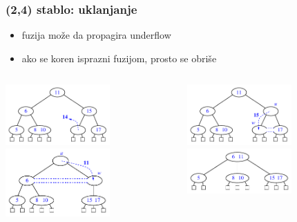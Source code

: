 \documentclass[compress]{beamer}
\begin{document}
\begin{frame}[fragile]
  \frametitle{(2,4) stablo: uklanjanje}
  \begin{itemize}
    \item fuzija može da propagira underflow
    \item ako se koren isprazni fuzijom, prosto se obriše
  \end{itemize}
  \begin{columns}
    \begin{column}[t]{6cm}
      \begin{center}
        \includegraphics[width=4cm]{asp-11-pic37a.pdf} \\
        \includegraphics[width=4cm]{asp-11-pic37c.pdf}
      \end{center}
    \end{column}
    \begin{column}[t]{6cm}
      \begin{center}
        \includegraphics[width=4cm]{asp-11-pic37b.pdf} \\
        \includegraphics[width=4cm]{asp-11-pic37d.pdf}
      \end{center}
    \end{column}
  \end{columns}
\end{frame}
\end{document}
